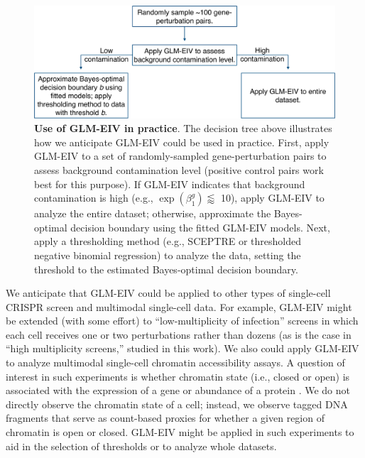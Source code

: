 \documentclass[12pt]{article}
\begin{document}
\begin{figure}
	\centering
	\includegraphics[width=0.9\linewidth]{figures/dec_tree.pdf}
	\caption{\textbf{Use of GLM-EIV in practice}. The decision tree above illustrates how we anticipate GLM-EIV could be used in practice. First, apply GLM-EIV to a set of randomly-sampled gene-perturbation pairs to assess background contamination level (positive control pairs work best for this purpose). If GLM-EIV indicates that background contamination is high (e.g., $\exp(\beta^g_1) \lessapprox $ 10), apply GLM-EIV to analyze the entire dataset; otherwise, approximate the Bayes-optimal decision boundary using the fitted GLM-EIV models. Next, apply a thresholding method (e.g., SCEPTRE or thresholded negative binomial regression) to analyze the data, setting the threshold to the estimated Bayes-optimal decision boundary.}\label{fig:dec_tree}
\end{figure}

We anticipate that GLM-EIV could be applied to other types of single-cell CRISPR screen and multimodal single-cell data. For example, GLM-EIV might be extended (with some effort) to ``low-multiplicity of infection'' screens  \parencite{Schraivogel2020} in which each cell receives one or two perturbations rather than dozens (as is the case in ``high multiplicity screens,'' studied in this work). We also could apply GLM-EIV to analyze multimodal single-cell chromatin accessibility assays. A question of interest in such experiments is whether chromatin state (i.e., closed or open) is associated with the expression of a gene or abundance of a protein \parencite{Mimitou2021}. We do not directly observe the chromatin state of a cell; instead, we observe tagged DNA fragments that serve as count-based proxies for whether a given region of chromatin is open or closed. GLM-EIV might be applied in such experiments to aid in the selection of thresholds or to analyze whole datasets.
\end{document}
